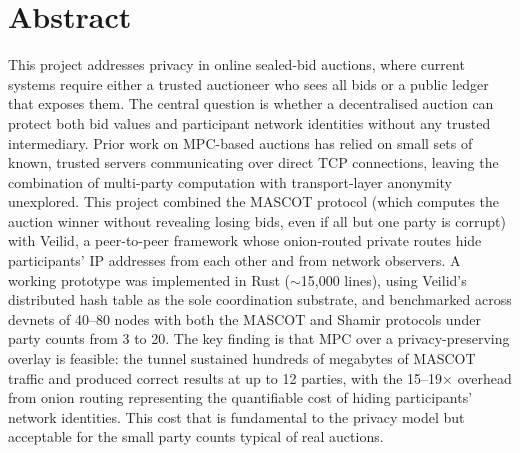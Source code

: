 %
%
%
%
%
%
%
%
\section*{Abstract}

This project addresses privacy in online sealed-bid auctions, where current
systems require either a trusted auctioneer who sees all bids or a public
ledger that exposes them.  The central question is whether a decentralised
auction can protect both bid values and participant network identities without
any trusted intermediary.  Prior work on MPC-based auctions has relied on
small sets of known, trusted servers communicating over direct TCP
connections, leaving the combination of multi-party computation with
transport-layer anonymity unexplored.  This project combined the MASCOT
protocol (which computes the auction winner without revealing losing bids,
even if all but one party is corrupt) with Veilid, a peer-to-peer framework
whose onion-routed private routes hide participants' IP addresses from each
other and from network observers.  A working prototype was implemented in
Rust (${\sim}$15,000 lines), using Veilid's distributed hash table as the
sole coordination substrate, and benchmarked across devnets of 40--80 nodes
with both the MASCOT and Shamir protocols under party counts from 3 to 20.
The key finding is that MPC over a privacy-preserving overlay is feasible:
the tunnel sustained hundreds of megabytes of MASCOT traffic and produced
correct results at up to 12 parties, with the 15--19$\times$ overhead from
onion routing representing the quantifiable cost of hiding participants'
network identities. This cost that is fundamental to the privacy model but
acceptable for the small party counts typical of real auctions.